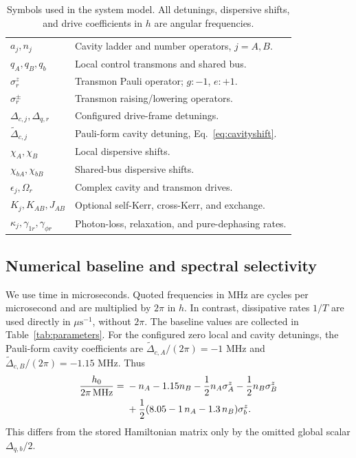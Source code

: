 \documentclass[aps,prb,reprint,amsmath,amssymb,nofootinbib]{revtex4-2}
\begin{document}
\begin{table}[t]
\caption{Symbols used in the system model. All detunings, dispersive shifts,
and drive coefficients in $h$ are angular frequencies.}
\label{tab:symbols}
\begin{ruledtabular}
\begin{tabular}{p{}p{}}
$a_j,n_j$ & Cavity ladder and number operators, $j=A,B$.\\
$q_A,q_B,q_b$ & Local control transmons and shared bus.\\
$\sigma_r^z$ & Transmon Pauli operator; $g:-1$, $e:+1$.\\
$\sigma_r^\pm$ & Transmon raising/lowering operators.\\
$\Delta_{c,j},\Delta_{q,r}$ & Configured drive-frame detunings.\\
$\widetilde\Delta_{c,j}$ & Pauli-form cavity detuning, Eq.~\eqref{eq:cavityshift}.\\
$\chi_A,\chi_B$ & Local dispersive shifts.\\
$\chi_{bA},\chi_{bB}$ & Shared-bus dispersive shifts.\\
$\epsilon_j,\Omega_r$ & Complex cavity and transmon drives.\\
$K_j,K_{AB},J_{AB}$ & Optional self-Kerr, cross-Kerr, and exchange.\\
$\kappa_j,\gamma_{1r},\gamma_{\phi r}$ & Photon-loss, relaxation, and pure-dephasing rates.\\
\end{tabular}
\end{ruledtabular}
\end{table}

\subsection{Numerical baseline and spectral selectivity}

We use time in microseconds. Quoted frequencies in MHz are cycles per
microsecond and are multiplied by $2\pi$ in $h$. In contrast, dissipative
rates $1/T$ are used directly in $\mu\mathrm{s}^{-1}$, without $2\pi$.
The baseline values are collected in Table~\ref{tab:parameters}. For the
configured zero local and cavity detunings, the Pauli-form cavity
coefficients are $\widetilde\Delta_{c,A}/(2\pi)=-1$ MHz and
$\widetilde\Delta_{c,B}/(2\pi)=-1.15$ MHz. Thus
\begin{align}
 \frac{h_0}{2\pi\,\mathrm{MHz}}={}&-n_A-1.15n_B
       -\frac{1}{2}n_A\sigma_A^z
       -\frac{1}{2}n_B\sigma_B^z\nonumber\\
 &+\frac12(8.05-1\,n_A-1.3\,n_B)\sigma_b^z .
 \label{eq:numerical}
\end{align}
This differs from the stored Hamiltonian matrix only by the omitted
global scalar $\Delta_{q,b}/2$.
\end{document}
